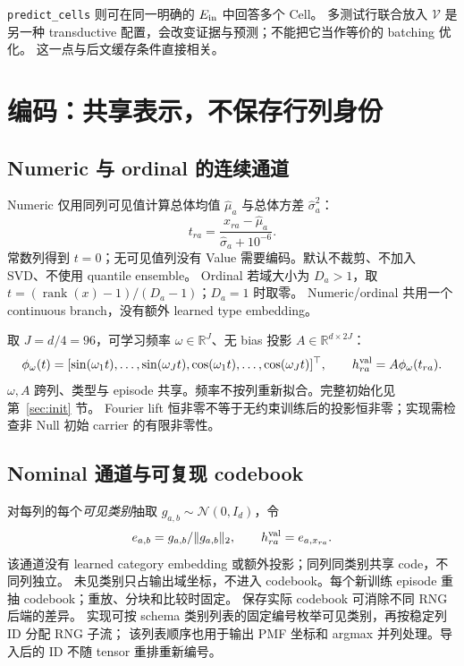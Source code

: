 \documentclass[11pt,UTF8,fontset=fandol]{ctexart}
\newcommand{\R}{\mathbb R}\newcommand{\V}{\mathcal V}\newcommand{\Q}{\mathcal Q}
\begin{document}
\texttt{predict\_cells} 则可在同一明确的 $E_{\rm in}$ 中回答多个 Cell。
多测试行联合放入 $\V$ 是另一种 transductive 配置，会改变证据与预测；不能把它当作等价的 batching 优化。
这一点与后文缓存条件直接相关。

\section{编码：共享表示，不保存行列身份}
\label{sec:encoding}

\subsection{Numeric 与 ordinal 的连续通道}
Numeric 仅用同列可见值计算总体均值 $\widehat\mu_a$ 与总体方差 $\widehat\sigma_a^2$：
\begin{equation}
 t_{ra}=\frac{x_{ra}-\widehat\mu_a}{\widehat\sigma_a+10^{-6}}.
 \label{eq:numeric-prep}
\end{equation}
常数列得到 $t=0$；无可见值列没有 Value 需要编码。默认不裁剪、不加入 SVD、不使用 quantile ensemble。
Ordinal 若域大小为 $D_a>1$，取 $t=(\operatorname{rank}(x)-1)/(D_a-1)$；$D_a=1$ 时取零。
Numeric/ordinal 共用一个 continuous branch，没有额外 learned type embedding。

取 $J=d/4=96$，可学习频率 $\omega\in\R^J$、无 bias 投影 $A\in\R^{d\times2J}$：
\begin{equation}
 \phi_\omega(t)=[\sin(\omega_1t),\ldots,\sin(\omega_Jt),
 \cos(\omega_1t),\ldots,\cos(\omega_Jt)]^\top,
 \qquad h^{\rm val}_{ra}=A\phi_\omega(t_{ra}).
 \label{eq:fourier}
\end{equation}
$\omega,A$ 跨列、类型与 episode 共享。频率不按列重新拟合。完整初始化见第~\ref{sec:init} 节。
Fourier lift 恒非零不等于无约束训练后的投影恒非零；实现需检查非 Null 初始 carrier 的有限非零性。

\subsection{Nominal 通道与可复现 codebook}
对每列的每个\emph{可见类别}抽取 $g_{a,b}\sim\mathcal N(0,I_d)$，令
\begin{equation}
 e_{a,b}=g_{a,b}/\|g_{a,b}\|_2,\qquad h^{\rm val}_{ra}=e_{a,x_{ra}}.
 \label{eq:nominal}
\end{equation}
该通道没有 learned category embedding 或额外投影；同列同类别共享 code，不同列独立。
未见类别只占输出域坐标，不进入 codebook。每个新训练 episode 重抽 codebook；重放、分块和比较时固定。
保存实际 codebook 可消除不同 RNG 后端的差异。
实现可按 schema 类别列表的固定编号枚举可见类别，再按稳定列 ID 分配 RNG 子流；
该列表顺序也用于输出 PMF 坐标和 argmax 并列处理。导入后的 ID 不随 tensor 重排重新编号。
\end{document}
